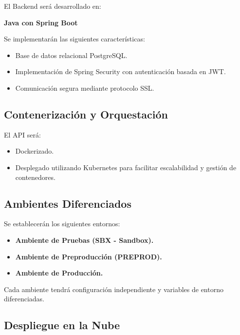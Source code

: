 \documentclass[12pt]{article}
\begin{document}
El Backend será desarrollado en:

\begin{center}
\textbf{Java con Spring Boot}
\end{center}

Se implementarán las siguientes características:

\begin{itemize}
    \item Base de datos relacional PostgreSQL.
    \item Implementación de Spring Security con autenticación basada en JWT.
    \item Comunicación segura mediante protocolo SSL.
\end{itemize}

\subsection{Contenerización y Orquestación}

El API será:

\begin{itemize}
    \item Dockerizado.
    \item Desplegado utilizando Kubernetes para facilitar escalabilidad y gestión de contenedores.
\end{itemize}

\subsection{Ambientes Diferenciados}

Se establecerán los siguientes entornos:

\begin{itemize}
    \item \textbf{Ambiente de Pruebas (SBX - Sandbox).}
    \item \textbf{Ambiente de Preproducción (PREPROD).}
    \item \textbf{Ambiente de Producción.}
\end{itemize}

Cada ambiente tendrá configuración independiente y variables de entorno diferenciadas.

\subsection{Despliegue en la Nube}
\end{document}
